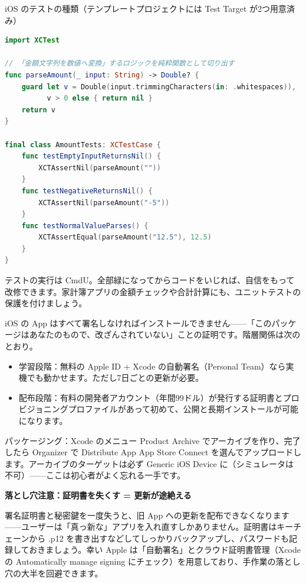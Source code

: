 \begin{center}\small\color{gray}iOS のテストの種類（テンプレートプロジェクトには Test Target が2つ用意済み）\end{center}

\begin{lstlisting}[language=Swift]
import XCTest

// 「金額文字列を数値へ変換」するロジックを純粋関数として切り出す
func parseAmount(_ input: String) -> Double? {
    guard let v = Double(input.trimmingCharacters(in: .whitespaces)),
          v > 0 else { return nil }
    return v
}

final class AmountTests: XCTestCase {
    func testEmptyInputReturnsNil() {
        XCTAssertNil(parseAmount(""))
    }
    func testNegativeReturnsNil() {
        XCTAssertNil(parseAmount("-5"))
    }
    func testNormalValueParses() {
        XCTAssertEqual(parseAmount("12.5"), 12.5)
    }
}
\end{lstlisting}

テストの実行は CmdU。全部緑になってからコードをいじれば、自信をもって改修できます。家計簿アプリの金額チェックや合計計算にも、ユニットテストの保護を付けましょう。


iOS の App はすべて署名しなければインストールできません——「このパッケージはあなたのもので、改ざんされていない」ことの証明です。階層関係は次のとおり。

\begin{itemize}
  \item 学習段階：無料の Apple ID + Xcode の自動署名（Personal Team）なら実機でも動かせます。ただし7日ごとの更新が必要。
  \item 配布段階：有料の開発者アカウント（年間99ドル）が発行する証明書とプロビジョニングプロファイルがあって初めて、公開と長期インストールが可能になります。
\end{itemize}

パッケージング：Xcode のメニュー Product Archive でアーカイブを作り、完了したら Organizer で Distribute App App Store Connect を選んでアップロードします。アーカイブのターゲットは必ず Generic iOS Device に（シミュレータは不可）——ここは初心者がよく忘れる一手です。

\textbf{落とし穴注意：証明書を失くす = 更新が途絶える}\par

署名証明書と秘密鍵を一度失うと、旧 App への更新を配布できなくなります——ユーザーは「真っ新な」アプリを入れ直すしかありません。証明書はキーチェーンから .p12 を書き出すなどしてしっかりバックアップし、パスワードも記録しておきましょう。幸い Apple は「自動署名」とクラウド証明書管理（Xcode の Automatically manage signing にチェック）を用意しており、手作業の落とし穴の大半を回避できます。

